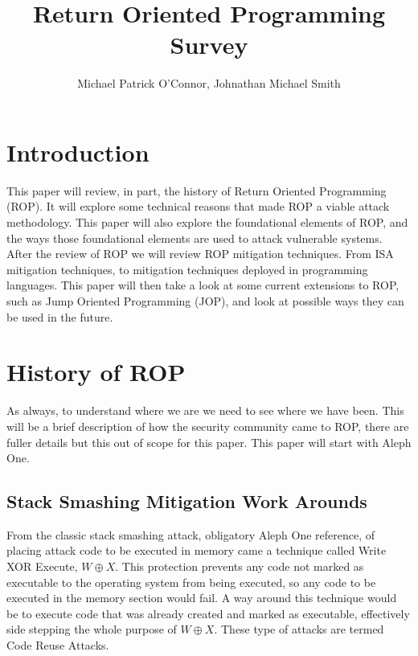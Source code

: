 \documentclass[11pt]{amsart}
\title{Return Oriented Programming Survey}
\author{Michael Patrick O'Connor, Johnathan Michael Smith}
\date{}
\begin{document}
\maketitle

\newpage
\section*{Introduction}
This paper will review, in part, the history of Return Oriented Programming (ROP). It will explore some technical reasons that made ROP a viable attack methodology. This paper will also explore the foundational elements of ROP, and the ways those foundational elements are used to attack vulnerable systems. After the review of ROP we will review ROP mitigation techniques. From ISA mitigation techniques, to mitigation techniques deployed in programming languages. This paper will then take a look at some current extensions to ROP, such as Jump Oriented Programming (JOP), and look at possible ways they can be used in the future.
\section*{History of ROP}
As always, to understand where we are we need to see where we have been.  This will be a brief description of how the security community came to ROP, there are fuller details but this out of scope for this paper.  This paper will start with Aleph One.
\subsection*{Stack Smashing Mitigation Work Arounds}
From the classic stack smashing attack, obligatory Aleph One reference, of placing attack code to be executed in memory came a technique called Write XOR Execute, $W \oplus X$. This protection prevents any code not marked as executable to the operating system from being executed, so any code to be executed in the memory section would fail. A way around this technique would be to execute code that was already created and marked as executable, effectively side stepping the whole purpose of $W \oplus X$.  These type of attacks are termed Code Reuse Attacks.
\end{document}
